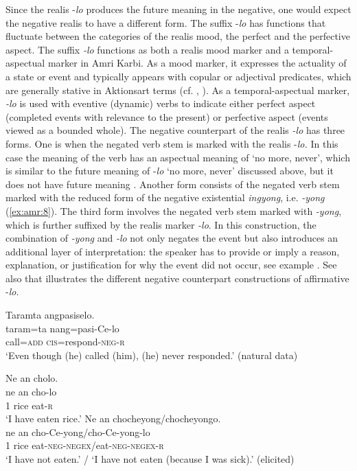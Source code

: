 \documentclass[output=paper,colorlinks,citecolor=brown]{langscibook}
\begin{document}
Since the realis -\textit{lo} produces the future meaning in the negative, one would expect the negative realis to have a different form. The suffix -\textit{lo} has functions that fluctuate between the categories of the realis mood, the perfect and the perfective aspect. The suffix \textit{-lo} functions as both a realis mood marker and a temporal-aspectual marker in Amri Karbi. As a mood marker, it expresses the actuality of a state or event and typically appears with copular or adjectival predicates, which are generally stative in Aktionsart terms (cf. \citealt[143-160]{Vendler1957},  \citealt{VanValin1997}). As a temporal-aspectual marker, \textit{-lo} is used with eventive (dynamic) verbs to indicate either perfect aspect (completed events with relevance to the present) or perfective aspect (events viewed as a bounded whole). The negative counterpart of the realis \textit{{}-lo} has three forms. One is when the negated verb stem is marked with the realis -\textit{lo.} In this case the meaning of the verb has an aspectual meaning of ‘no more, never’, which is similar to the future meaning of -\textit{lo} ‘no more, never’ discussed above, but it does not have future meaning . Another form consists of the negated verb stem marked with the reduced form of the negative existential \textit{ingyong}, i.e. \textit{{}-yong} (\ref{ex:amr:8}). The third form involves the negated verb stem marked with \textit{-yong}, which is further suffixed by the realis marker \textit{-lo}. In this construction, the combination of \textit{-yong} and \textit{-lo} not only negates the event but also introduces an additional layer of interpretation: the speaker has to provide or imply a reason, explanation, or justification for why the event did not occur, see example . See also  that illustrates the different negative counterpart constructions of affirmative -\textit{lo}.

\ea\label{ex:amr:7} Taramta angpasiselo.\\
    \gll  taram=ta nang=pasi-Ce-lo\\
          call=\textsc{add} \textsc{cis}=respond-\textsc{neg}{}-\textsc{r}\\
    \glt ‘Even though (he) called (him), (he) never responded.’ (natural data)
\z

\ea\label{ex:amr:8}
    \ea\label{ex:amr:8a} Ne an cholo.  \\
        \gll  ne an cho-lo \\
              1 rice eat-\textsc{r} \\
        \glt ‘I have eaten rice.’ 
    \ex\label{ex:amr:8b} Ne an chocheyong/chocheyongo. \\
        \gll ne an cho-Ce-yong/cho-Ce-yong-lo \\
              1 rice eat-\textsc{neg}{}-\textsc{negex}/eat-\textsc{neg}{}-\textsc{negex}{}-\textsc{r} \\
        \glt ‘I have not eaten.’ / ‘I have not eaten (because I was sick).’ (elicited)
    \z
\z 
\end{document}
